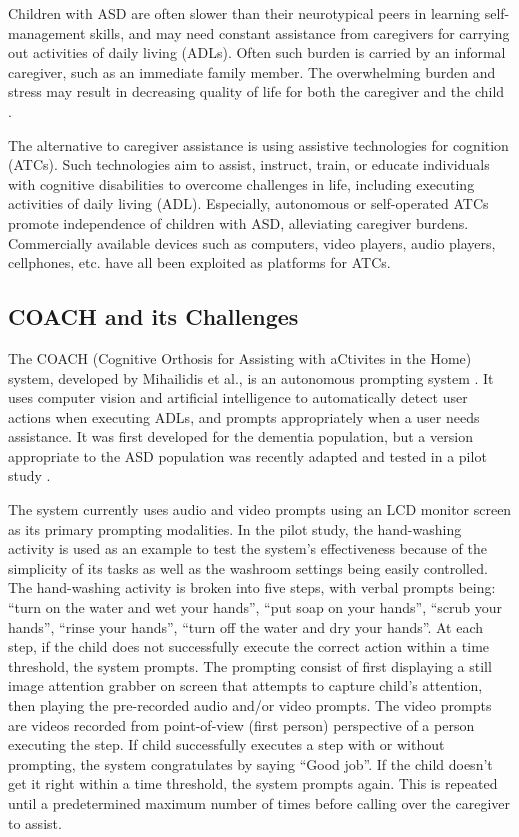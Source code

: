\documentclass{ut-thesis}
\begin{document}
Children with ASD are often slower than their neurotypical peers in learning self-management skills, and may need constant assistance from caregivers for carrying out activities of daily living (ADLs).  Often such burden is carried by an informal caregiver, such as an immediate family member.  The overwhelming burden and stress may result in decreasing quality of life for both the caregiver and the child \cite{burgess2007quality}.


The alternative to caregiver assistance is using assistive technologies for cognition (ATCs).  Such technologies aim to assist, instruct, train, or educate individuals with cognitive disabilities to overcome challenges in life, including executing activities of daily living (ADL).  Especially, autonomous or self-operated ATCs promote independence of children with ASD, alleviating caregiver burdens.  Commercially available devices such as computers, video players, audio players, cellphones, etc. have all been exploited as platforms for ATCs.


\subsection{COACH and its Challenges}

The COACH (Cognitive Orthosis for Assisting with aCtivites in the Home) system, developed by Mihailidis et al., is an autonomous prompting system \cite{mihailidis2008coach}.  It uses computer vision and artificial intelligence to automatically detect user actions when executing ADLs, and prompts appropriately when a user needs assistance.  It was first developed for the dementia population, but a version appropriate to the ASD population was recently adapted and tested in a pilot study \cite{bimbrahw2012investigating}.


The system currently uses audio and video prompts using an LCD monitor screen as its primary prompting modalities.  In the pilot study, the hand-washing activity is used as an example to test the system's effectiveness because of the simplicity of its tasks as well as the washroom settings being easily controlled.  The hand-washing activity is broken into five steps, with verbal prompts being: ``turn on the water and wet your hands'', ``put soap on your hands'', ``scrub your hands'', ``rinse your hands'', ``turn off the water and dry your hands''.  At each step, if the child does not successfully execute the correct action within a time threshold, the system prompts.  The prompting consist of first displaying a still image attention grabber on screen that attempts to capture child's attention, then playing the pre-recorded audio and/or video prompts.  The video prompts are videos recorded from point-of-view (first person) perspective of a person executing the step.  If child successfully executes a step with or without prompting, the system congratulates by saying ``Good job''.  If the child doesn't get it right within a time threshold, the system prompts again.  This is repeated until a predetermined maximum number of times before calling over the caregiver to assist.  
\end{document}
